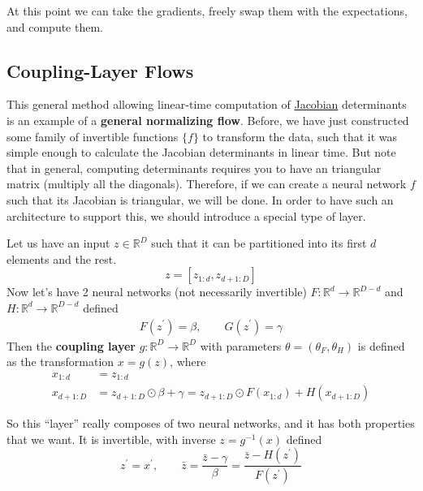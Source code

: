 \documentclass{article}
\begin{document}
  At this point we can take the gradients, freely swap them with the expectations, and compute them. 

\subsection{Coupling-Layer Flows} 

    This general method allowing linear-time computation of \hyperref[mv-def:jacobian]{Jacobian} determinants is an example of a \textbf{general normalizing flow}. Before, we have just constructed some family of invertible functions $\{f\}$ to transform the data, such that it was simple enough to calculate the Jacobian determinants in linear time. But note that in general, computing determinants requires you to have an triangular matrix (multiply all the diagonals). Therefore, if we can create a neural network $f$ such that its Jacobian is triangular, we will be done. In order to have such an architecture to support this, we should introduce a special type of layer.  

    \begin{definition}
      \label{def:affine-coupling-layer}
      Let us have an input $z \in \mathbb{R}^D$ such that it can be partitioned into its first $d$ elements and the rest. 
      \begin{equation}
        z = [z_{1:d}, z_{d+1:D}]
      \end{equation}
      Now let's have 2 neural networks (not necessarily invertible) $F: \mathbb{R}^d \rightarrow \mathbb{R}^{D-d}$ and $H: \mathbb{R}^d \rightarrow \mathbb{R}^{D-d}$ defined 
      \begin{align}
        F(z^\prime) = \beta, \qquad G(z^\prime) = \gamma
      \end{align}
      Then the \textbf{coupling layer} $g: \mathbb{R}^D \rightarrow \mathbb{R}^D$ with parameters $\theta = (\theta_F, \theta_H)$ is defined as the transformation $x = g(z)$, where
      \begin{align}
        x_{1:d} & = z_{1:d} \\ 
        x_{d+1:D} & = z_{d+1:D} \odot \beta + \gamma = z_{d+1:D} \odot F(x_{1:d}) + H(x_{d+1:D})
      \end{align}
    \end{definition}

    So this ``layer'' really composes of two neural networks, and it has both properties that we want. It is invertible, with inverse $z = g^{-1} (x)$ defined 
    \begin{equation}
      z^\prime = x^\prime, \qquad \bar{z} = \frac{\bar{z} - \gamma}{\beta} = \frac{\bar{z} - H(z^\prime)}{F(z^\prime)} 
    \end{equation} 
\end{document}
